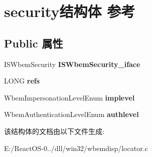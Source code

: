 \hypertarget{structsecurity}{}\section{security结构体 参考}
\label{structsecurity}
\subsection*{Public 属性}
\begin{DoxyCompactItemize}
\item 
\mbox{\label{structsecurity_af344a7b02289bba9a8ec143f64b73c96}} 
I\+S\+Wbem\+Security {\bfseries I\+S\+Wbem\+Security\+\_\+iface}
\item 
\mbox{\label{structsecurity_a53780571aa81180c00f1aec1866088bf}} 
L\+O\+NG {\bfseries refs}
\item 
\mbox{\label{structsecurity_afb06684599052c7aacf2cfce76491242}} 
Wbem\+Impersonation\+Level\+Enum {\bfseries implevel}
\item 
\mbox{\label{structsecurity_a2f0ca9c24b44725208d6cfc8de144da8}} 
Wbem\+Authentication\+Level\+Enum {\bfseries authlevel}
\end{DoxyCompactItemize}


该结构体的文档由以下文件生成\+:\begin{DoxyCompactItemize}
\item 
E\+:/\+React\+O\+S-\/0../dll/win32/wbemdisp/locator.\+c\end{DoxyCompactItemize}
